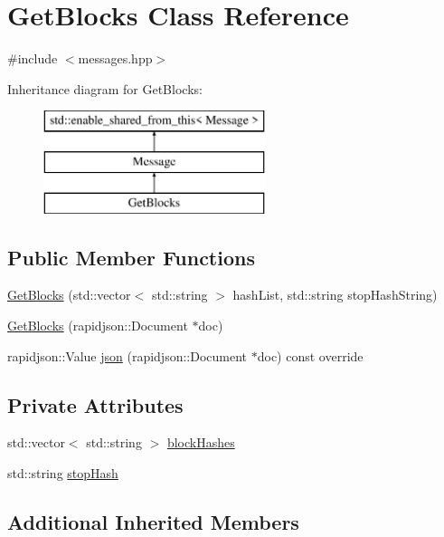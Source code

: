 \hypertarget{classGetBlocks}{}\section{Get\+Blocks Class Reference}
\label{classGetBlocks}


{\ttfamily \#include $<$messages.\+hpp$>$}

Inheritance diagram for Get\+Blocks\+:\begin{figure}[H]
\begin{center}
\leavevmode
\includegraphics[height=3.000000cm]{classGetBlocks}
\end{center}
\end{figure}
\subsection*{Public Member Functions}
\begin{DoxyCompactItemize}
\item 
\mbox{\hyperlink{classGetBlocks_aec0906bd19989a7982cad0aefc3d750a}{Get\+Blocks}} (std\+::vector$<$ std\+::string $>$ hash\+List, std\+::string stop\+Hash\+String)
\item 
\mbox{\hyperlink{classGetBlocks_a0ce69110b775f4f122f6a20222cc0b64}{Get\+Blocks}} (rapidjson\+::\+Document $\ast$doc)
\item 
rapidjson\+::\+Value \mbox{\hyperlink{classGetBlocks_a8b77916e999ba0a730e31b90b4733928}{json}} (rapidjson\+::\+Document $\ast$doc) const override
\end{DoxyCompactItemize}
\subsection*{Private Attributes}
\begin{DoxyCompactItemize}
\item 
std\+::vector$<$ std\+::string $>$ \mbox{\hyperlink{classGetBlocks_a24b217db1c15cdfcd91fbebf2b10238a}{block\+Hashes}}
\item 
std\+::string \mbox{\hyperlink{classGetBlocks_a7b367127191d3855f593dc7b96188853}{stop\+Hash}}
\end{DoxyCompactItemize}
\subsection*{Additional Inherited Members}



